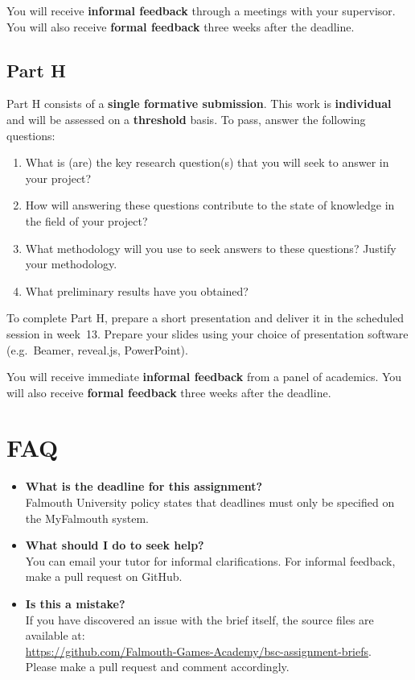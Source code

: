 You will receive \textbf{informal feedback} through a meetings with your supervisor.
You will also receive \textbf{formal feedback} three weeks after the deadline.

\subsection*{Part H}

Part H consists of a \textbf{single formative submission}.
This work is \textbf{individual} and will be assessed on a \textbf{threshold} basis.
To pass, answer the following questions:

\begin{enumerate}[label=(\roman*)]
	\item What is (are) the key research question(s) that you will seek to
		answer in your project?
	\item How will answering these questions contribute to the state of knowledge
		in the field of your project?
	\item What methodology will you use to seek answers to these questions?
		Justify your methodology.
	\item What preliminary results have you obtained?
\end{enumerate}

To complete Part H, prepare a short presentation 
and deliver it in the scheduled session in week~13.
Prepare your slides using your choice of presentation software
(e.g.\ Beamer, reveal.js, PowerPoint).

You will receive immediate \textbf{informal feedback} from a panel of academics.
You will also receive \textbf{formal feedback} three weeks after the deadline.

\section*{FAQ}

\begin{itemize}
	\item 	\textbf{What is the deadline for this assignment?} \\ 
    		Falmouth University policy states that deadlines must only be specified on the MyFalmouth system.
    		
	\item 	\textbf{What should I do to seek help?} \\ 
    		You can email your tutor for informal clarifications. For informal feedback, make a pull request on GitHub. 
    		
    	\item 	\textbf{Is this a mistake?} \\ 	
    		If you have discovered an issue with the brief itself, the source files are available at: \\
    		\url{https://github.com/Falmouth-Games-Academy/bsc-assignment-briefs}.\\
    		 Please make a pull request and comment accordingly.
\end{itemize}

